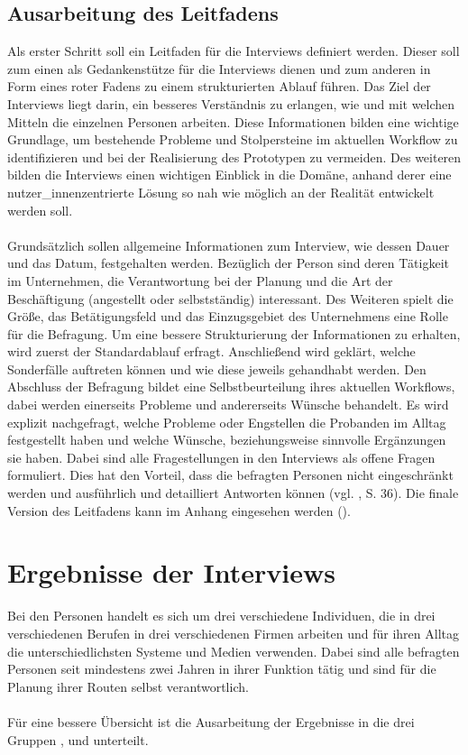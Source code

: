 \documentclass[Bachelorarbeit.tex]{subfiles}
\begin{document}
\subsection{Ausarbeitung des Leitfadens}

Als erster Schritt soll ein Leitfaden für die Interviews definiert werden. 
Dieser soll zum einen als Gedankenstütze für die Interviews dienen und zum anderen in Form eines roter Fadens zu einem strukturierten Ablauf führen.
Das Ziel der Interviews liegt darin, ein besseres Verständnis zu erlangen, wie und mit welchen Mitteln die einzelnen Personen arbeiten.
Diese Informationen bilden eine wichtige Grundlage, um bestehende Probleme und Stolpersteine im aktuellen Workflow zu identifizieren und bei der Realisierung des Prototypen zu vermeiden. 
Des weiteren bilden die Interviews einen wichtigen Einblick in die Domäne, anhand derer eine nutzer\_innenzentrierte Lösung so nah wie möglich an der Realität entwickelt werden soll.\\
\\
Grundsätzlich sollen allgemeine Informationen zum Interview, wie dessen Dauer und das Datum, festgehalten werden.
Bezüglich der Person sind deren Tätigkeit im Unternehmen, die Verantwortung bei der Planung und die Art der Beschäftigung (angestellt oder selbstständig) interessant.
Des Weiteren spielt die Größe, das Betätigungsfeld und das Einzugsgebiet des Unternehmens eine Rolle für die Befragung.
Um eine bessere Strukturierung der Informationen zu erhalten, wird zuerst der Standardablauf erfragt. 
Anschließend wird geklärt, welche Sonderfälle auftreten können und wie diese jeweils gehandhabt werden.
Den Abschluss der Befragung bildet eine Selbstbeurteilung ihres aktuellen Workflows, dabei werden einerseits Probleme und andererseits Wünsche behandelt.
Es wird explizit nachgefragt, welche Probleme oder Engstellen die Probanden im Alltag festgestellt haben und welche Wünsche, beziehungsweise sinnvolle Ergänzungen sie haben. 
Dabei sind alle Fragestellungen in den Interviews als offene Fragen formuliert. 
Dies hat den Vorteil, dass die befragten Personen nicht eingeschränkt werden und ausführlich und detailliert Antworten können (vgl. \cite{Mayer2006}, S. 36).
Die finale Version des Leitfadens kann im Anhang eingesehen werden (). 


\section{Ergebnisse der Interviews}
Bei den Personen handelt es sich um drei verschiedene Individuen, die in drei verschiedenen Berufen in drei verschiedenen Firmen arbeiten und für ihren Alltag die unterschiedlichsten Systeme und Medien verwenden. 
Dabei sind alle befragten Personen seit mindestens zwei Jahren in ihrer Funktion tätig und sind für die Planung ihrer Routen selbst verantwortlich.
\\
\\
Für eine bessere Übersicht ist die Ausarbeitung der Ergebnisse in die drei Gruppen
,  und  unterteilt. 
\end{document}
